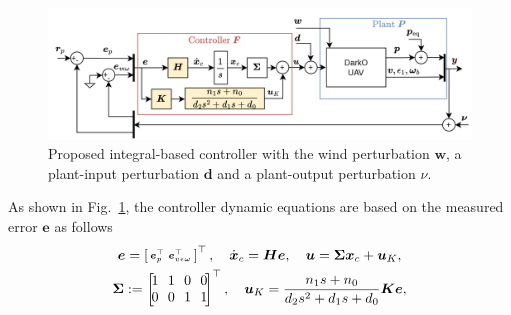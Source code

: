 \begin{figure}[t!]
    \centering
    \includegraphics[width=1\columnwidth]{figures/commande_integrale.png}
    \caption{Proposed integral-based controller with the wind perturbation $\boldsymbol{w}$, a plant-input perturbation $\boldsymbol{d}$ and a plant-output perturbation $\nu$.}
    \label{fig:commande_int}
\end{figure}
As shown in Fig.~\ref{fig:commande_int}, the controller dynamic equations are based on the measured error $\boldsymbol{e}$ as follows
\begin{multline}
\label{eq:contoller}
    \boldsymbol{e} = \smallmat{
        \boldsymbol{e}_{p}^\top & \boldsymbol{e}_{v\epsilon\omega}^\top}^\top, \quad \dot{\boldsymbol{x}}_{c} = \boldsymbol{H} \boldsymbol{e}, \quad    \boldsymbol{u} = \boldsymbol{\Sigma} \boldsymbol{x}_{c} + \boldsymbol{u}_{K},\\
    \boldsymbol{\Sigma} := \begin{bmatrix} \! 1 \!&\! 1\! & \!0\! &\! 0\!\\ \!0\! & \!0\! & \!1 \!& \!1\!\end{bmatrix}^\top, \quad
    \boldsymbol{u}_{K} = \frac{n_1 s+n_0}{d_2 s^{2}+d_1 s + d_0}\boldsymbol{K} \boldsymbol{e} ,
\end{multline}
